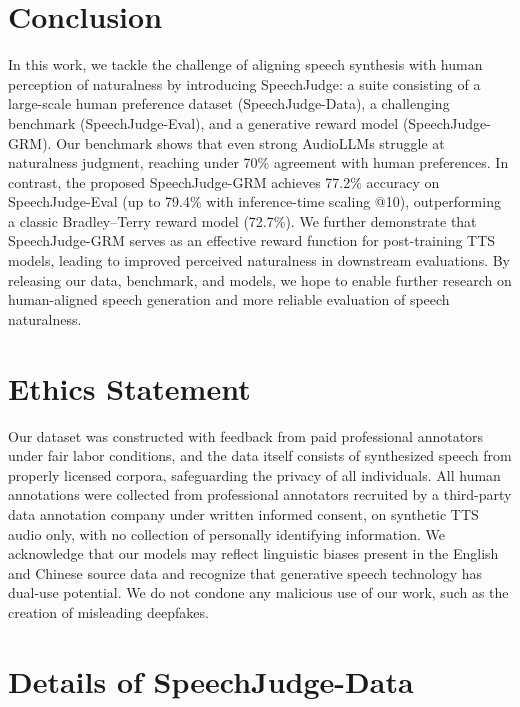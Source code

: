 \documentclass[]{bytedance_seed}
\begin{document}
\section{Conclusion}

In this work, we tackle the challenge of aligning speech synthesis with human perception of naturalness by introducing SpeechJudge: a suite consisting of a large-scale human preference dataset (SpeechJudge-Data), a challenging benchmark (SpeechJudge-Eval), and a generative reward model (SpeechJudge-GRM). Our benchmark shows that even strong AudioLLMs struggle at naturalness judgment, reaching under 70\% agreement with human preferences. In contrast, the proposed SpeechJudge-GRM achieves 77.2\% accuracy on SpeechJudge-Eval (up to 79.4\% with inference-time scaling @10), outperforming a classic Bradley–Terry reward model (72.7\%). We further demonstrate that SpeechJudge-GRM serves as an effective reward function for post-training TTS models, leading to improved perceived naturalness in downstream evaluations. By releasing our data, benchmark, and models, we hope to enable further research on human-aligned speech generation and more reliable evaluation of speech naturalness.


\section*{Ethics Statement}
Our dataset was constructed with feedback from paid professional annotators under fair labor conditions, and the data itself consists of synthesized speech from properly licensed corpora, safeguarding the privacy of all individuals. {All human annotations were collected from professional annotators recruited by a third-party data annotation company under written informed consent, on synthetic TTS audio only, with no collection of personally identifying information.} We acknowledge that our models may reflect linguistic biases present in the English and Chinese source data and recognize that generative speech technology has dual-use potential. We do not condone any malicious use of our work, such as the creation of misleading deepfakes.






\beginappendix

% 

\section{Details of SpeechJudge-Data}\label{app:speechjudge-data}
\end{document}
